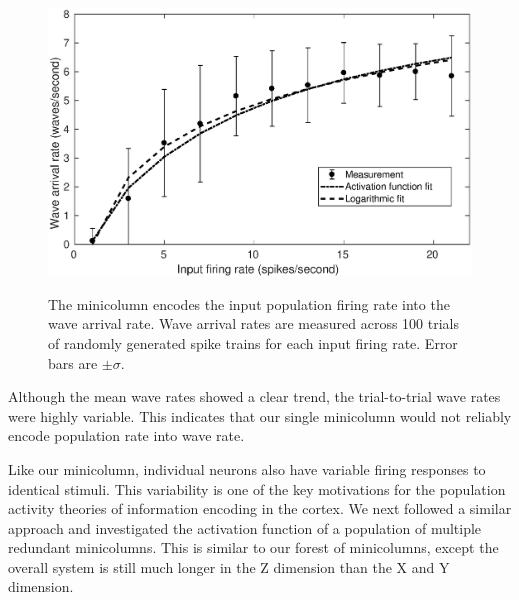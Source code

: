 \begin{figure}[!htb]
 \centering
 \caption{The minicolumn encodes the input population firing rate into the wave arrival rate. 
          Wave arrival rates are measured across 100 trials of randomly generated spike trains for each input firing rate.
          Error bars are $\pm \sigma$. }
 \includegraphics[width=\textwidth]{fig/SCE_2x2_FRE}
 \label{fig:sce_activation_function}
\end{figure}

Although the mean wave rates showed a clear trend, the trial-to-trial wave rates were highly variable. 
This indicates that our single minicolumn would not reliably encode population rate into wave rate.

\FloatBarrier

Like our minicolumn, individual neurons also have variable firing responses to identical stimuli.
This variability is one of the key motivations for the population activity theories of information encoding in the cortex.
We next followed a similar approach and investigated the activation function of a population of multiple redundant minicolumns.
This is similar to our forest of minicolumns, except the overall system is still much longer in the Z dimension than the X and Y dimension.

